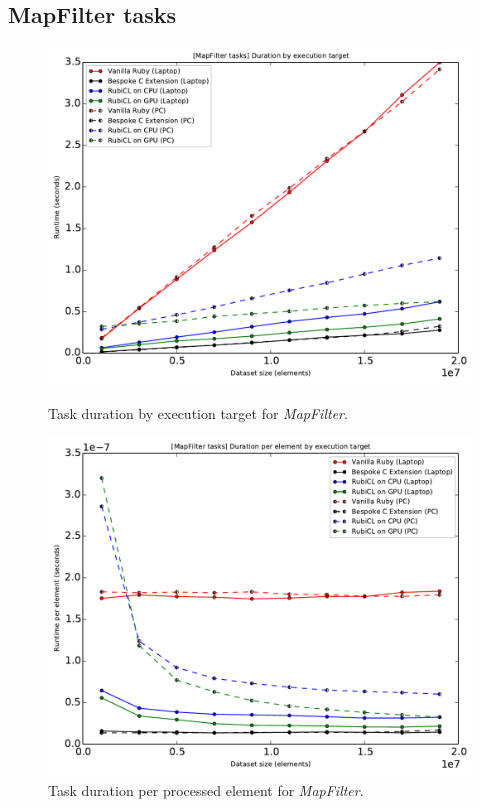 \subsection{MapFilter tasks}
\begin{figure}[H]
  \centering
  \includegraphics[width=\textwidth]{./graphing/mapfilter/runtimes.pdf}
  \caption{Task duration by execution target for \emph{MapFilter}.}
  \label{fig:mfilter_task_runtime_g}

  \includegraphics[width=\textwidth]{./graphing/mapfilter/per_element.pdf}
  \caption{Task duration per processed element for \emph{MapFilter}.}
  \label{fig:mfilter_task_per_el_g}

\end{figure}

